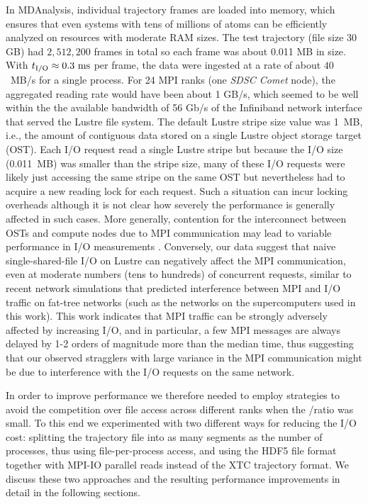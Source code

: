 In MDAnalysis, individual trajectory frames are loaded into memory, which ensures that even systems with tens of millions of atoms can be efficiently analyzed on resources with moderate RAM sizes. 
The test trajectory (file size 30 GB) had $2,512,200$ frames in total so each frame was about 0.011 MB in size.
With ${t}_{\text{I/O}} \approx 0.3~\text{ms}$ per frame, the data were ingested at a rate of about $40$~MB/s for a single process.
For 24 MPI ranks (one \emph{SDSC Comet} node), the aggregated reading rate would have been about 1 GB/s, which seemed to be well within the the available bandwidth of 56 Gb/s of the Infiniband network interface that served the Lustre file system.
The default Lustre stripe size value was 1~MB, i.e., the amount of contiguous data stored on a single Lustre object storage target (OST).
Each I/O request read a single Lustre stripe but because the I/O size (0.011~MB) was smaller than the stripe size, many of these I/O requests were likely just accessing the same stripe on the same OST but nevertheless had to acquire a new reading lock for each request.
Such a situation can incur locking overheads \cite{optimize_lustre} although it is not clear how severely the performance is generally affected in such cases.
More generally, contention for the interconnect between OSTs and compute nodes due to MPI communication may lead to variable performance in I/O measurements \cite{Mache:2005aa}.
Conversely, our data suggest that naive single-shared-file I/O on Lustre can negatively affect the MPI communication, even at moderate numbers (tens to hundreds) of concurrent requests, similar to recent network simulations that predicted interference between MPI and I/O traffic on fat-tree networks \cite{Brown:2018ab} (such as the networks on the supercomputers used in this work).
This work indicates that MPI traffic can be strongly adversely affected by increasing I/O, and in particular, a few MPI messages are always delayed by 1-2 orders of magnitude more than the median time, thus suggesting that our observed stragglers with large variance in the MPI communication might be due to interference with the I/O requests on the same network.

In order to improve performance we therefore needed to employ strategies to avoid the competition over file access across different ranks when the \tcomp/\tIO ratio was small.
To this end we experimented with two different ways for reducing the I/O cost:
splitting the trajectory file into as many segments as the number of processes, thus using file-per-process access, and using the HDF5 file format together with MPI-IO parallel reads instead of the XTC trajectory format.
We discuss these two approaches and the resulting performance improvements in detail in the following sections.

